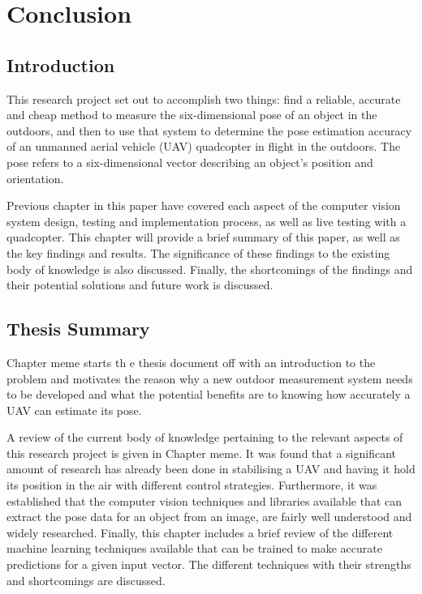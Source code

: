 \chapter{Conclusion}

\section{Introduction}

This research project set out to accomplish two things: find a reliable, accurate and cheap method to measure the six-dimensional pose of an object in the outdoors, and then to use that system to determine the pose estimation accuracy of an unmanned aerial vehicle (UAV) quadcopter in flight in the outdoors. The pose refers to a six-dimensional vector describing an object's position and orientation. 

Previous chapter in this paper have covered each aspect of the computer vision system design, testing and implementation process, as well as live testing with a quadcopter. This chapter will provide a brief summary of this paper, as well as the key findings and results. The significance of these findings to the existing body of knowledge is also discussed. Finally, the shortcomings of the findings and their potential solutions and future work is discussed. 

\section{Thesis Summary}

Chapter meme starts th e thesis document off with an introduction to the problem and motivates the reason why a new outdoor measurement system needs to be developed and what the potential benefits are to knowing how accurately a UAV can estimate its pose.  

A review of the current body of knowledge pertaining to the relevant aspects of this research project is given in Chapter meme. It was found that a significant amount of research has already been done in stabilising a UAV and having it hold its position in the air with different control strategies. Furthermore, it was established that the computer vision techniques and libraries available that can extract the pose data for an object from an image, are fairly well understood and widely researched. Finally, this chapter includes a brief review of the different machine learning techniques available that can be trained to make accurate predictions for a given input vector. The different techniques with their strengths and shortcomings are discussed.  

